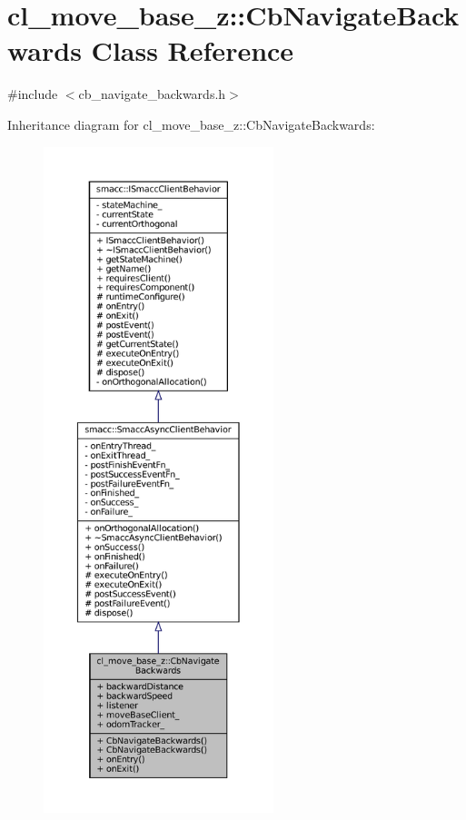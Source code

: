 \hypertarget{classcl__move__base__z_1_1CbNavigateBackwards}{}\section{cl\+\_\+move\+\_\+base\+\_\+z\+:\+:Cb\+Navigate\+Backwards Class Reference}
\label{classcl__move__base__z_1_1CbNavigateBackwards}


{\ttfamily \#include $<$cb\+\_\+navigate\+\_\+backwards.\+h$>$}



Inheritance diagram for cl\+\_\+move\+\_\+base\+\_\+z\+:\+:Cb\+Navigate\+Backwards\+:
\nopagebreak
\begin{figure}[H]
\begin{center}
\leavevmode
\includegraphics[height=550pt]{classcl__move__base__z_1_1CbNavigateBackwards__inherit__graph}
\end{center}
\end{figure}


